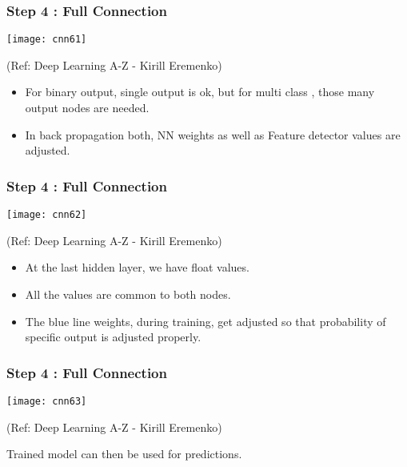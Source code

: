 \begin{frame}[fragile] \frametitle{Step 4 : Full Connection}

\begin{center}
\texttt{[image: cnn61]}

\tiny{(Ref: Deep Learning A-Z - Kirill Eremenko)}
\end{center}

\begin{itemize}
\item For binary output, single output is ok, but for multi class , those many output nodes are needed.
\item In back propagation both, NN weights as well as Feature detector values are adjusted.

\end{itemize}

\end{frame}

\begin{frame}[fragile] \frametitle{Step 4 : Full Connection}

\begin{center}
\texttt{[image: cnn62]}

\tiny{(Ref: Deep Learning A-Z - Kirill Eremenko)}
\end{center}

\begin{itemize}
\item At the last hidden layer, we have float values.
\item All the values are common to both nodes.
\item The blue line weights, during training, get adjusted so that probability of specific output is adjusted properly.

\end{itemize}

\end{frame}

\begin{frame}[fragile] \frametitle{Step 4 : Full Connection}

\begin{center}
\texttt{[image: cnn63]}

\tiny{(Ref: Deep Learning A-Z - Kirill Eremenko)}
\end{center}

Trained model can then be used for predictions.
\end{frame}


